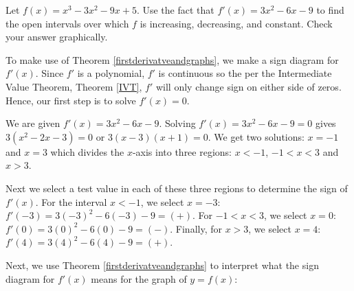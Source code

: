 \documentclass{ximera}
\begin{document}
\begin{example}\label{polyincdec}  Let  $f(x) = x^3 - 3x^2 - 9x+5$.  Use the fact that $f'(x) = 3x^2-6x-9$  to find the open intervals over which $f$ is increasing, decreasing, and constant.  Check your answer graphically.

\begin{explanation}To make use of Theorem \ref{firstderivatveandgraphs}, we make a sign diagram for $f'(x)$.  Since $f'$ is a polynomial, $f'$ is continuous so the per the Intermediate Value Theorem, Theorem \ref{IVT}, $f'$ will only change sign on either side of zeros. Hence, our first step is to solve  $f'(x) = 0$.  

We are given  $f'(x) = 3x^2-6x-9$.   Solving $f'(x) =  3x^2-6x-9 = 0$  gives  $3(x^2-2x-3) = 0$ or   $3(x-3)(x+1) = 0$.  We get two solutions:  $x = -1$ and $x = 3$ which divides the $x$-axis into three regions:  $x< -1$, $-1<x<3$ and $x>3$. 

Next we select a test value in each of these three regions to determine the sign of $f'(x)$.  For the interval $x<-1$, we select $x = -3$:   $f'(-3) = 3(-3)^2-6(-3)-9 = (+)$.  For $-1<x<3$, we select $x = 0$:  $f'(0) =  3(0)^2-6(0)-9 = (-)$. Finally, for $x>3$, we select $x = 4$:  $f'(4) = 3(4)^2-6(4)-9  = (+)$.

\begin{image}
\end{image}

Next, we use Theorem \ref{firstderivatveandgraphs} to interpret what the sign diagram for $f'(x)$ means for the graph of $y = f(x)$:



\end{explanation}
\end{example}
\end{document}
